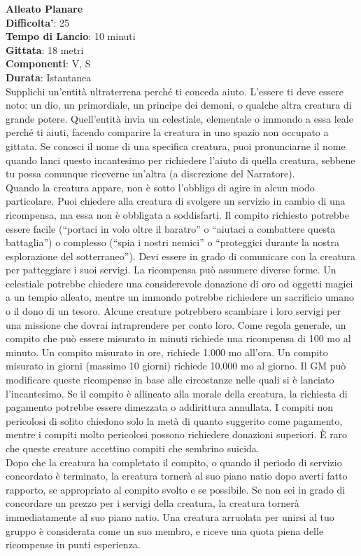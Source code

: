 \begin{multicols}{2}
\medskip\textbf{Alleato Planare}\\
\textbf{Difficolta'}: 25\\
\textbf{Tempo di Lancio}: 10 minuti\\
\textbf{Gittata}: 18 metri\\
\textbf{Componenti}: V, S\\
\textbf{Durata}: Istantanea\\
Supplichi un’entità ultraterrena perché ti conceda aiuto. L’essere ti deve essere noto: un dio, un primordiale, un principe dei demoni, o qualche altra creatura di grande potere. Quell’entità invia un celestiale, elementale o immondo a essa leale perché ti aiuti, facendo comparire la creatura in uno spazio non occupato a gittata. Se conosci il nome di una specifica creatura, puoi pronunciarne il nome quando lanci questo incantesimo per richiedere l’aiuto di quella creatura, sebbene tu possa comunque riceverne un’altra (a discrezione del Narratore).\\
Quando la creatura appare, non è sotto l’obbligo di agire in alcun modo particolare. Puoi chiedere alla creatura di svolgere un servizio in cambio di una ricompensa, ma essa non è obbligata a soddisfarti. Il compito richiesto potrebbe essere facile (“portaci in volo oltre il baratro” o “aiutaci a combattere questa battaglia”) o complesso (“spia i nostri nemici” o “proteggici durante la nostra esplorazione del sotterraneo”). Devi essere in grado di comunicare con la creatura per patteggiare i suoi servigi. La ricompensa può assumere diverse forme. Un celestiale potrebbe chiedere una considerevole donazione di oro od oggetti magici a un tempio alleato, mentre un immondo potrebbe richiedere un sacrificio umano o il dono di un tesoro. Alcune creature potrebbero scambiare i loro servigi per una missione che dovrai intraprendere per conto loro. Come regola generale, un compito che può essere misurato in minuti richiede una ricompensa di 100 mo al minuto. Un compito misurato in ore, richiede 1.000 mo all’ora. Un compito misurato in giorni (massimo 10 giorni) richiede 10.000 mo al giorno. Il GM può modificare queste ricompense in base alle circostanze nelle quali si è lanciato l’incantesimo. Se il compito è allineato alla morale della creatura, la richiesta di pagamento potrebbe essere dimezzata o addirittura annullata. I compiti non pericolosi di solito chiedono solo la metà di quanto suggerito come pagamento, mentre i compiti molto pericolosi possono richiedere donazioni superiori. È raro che queste creature accettino compiti che sembrino suicida.\\
Dopo che la creatura ha completato il compito, o quando il periodo di servizio concordato è terminato, la creatura tornerà al suo piano natio dopo averti fatto rapporto, se appropriato al compito svolto e se possibile. Se non sei in grado di concordare un prezzo per i servigi della creatura, la creatura tornerà immediatamente al suo piano natio. Una creatura arruolata per unirsi al tuo gruppo è considerata come un suo membro, e riceve una quota piena delle ricompense in punti esperienza.


\end{multicols}
